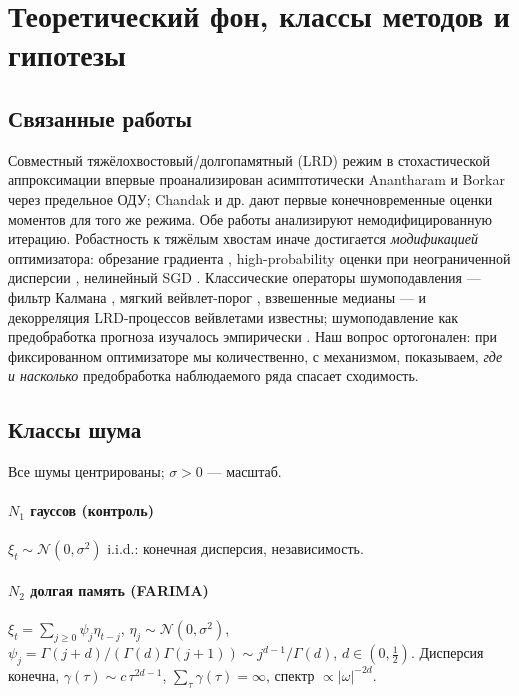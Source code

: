 \documentclass[conference]{IEEEtran}
\theoremstyle{plain}
\theoremstyle{definition}
\begin{document}
\section{Теоретический фон, классы методов и гипотезы}

\subsection{Связанные работы}
Совместный тяжёлохвостовый/долгопамятный (LRD) режим в стохастической
аппроксимации впервые проанализирован асимптотически Anantharam и
Borkar \cite{anantharam2012sa} через предельное ОДУ; Chandak и др.
\cite{chandak2026hl} дают первые конечновременные оценки моментов для
того же режима. Обе работы анализируют немодифицированную итерацию.
Робастность к тяжёлым хвостам иначе достигается \emph{модификацией}
оптимизатора: обрезание градиента \cite{gorbunov2020clipping},
high-probability оценки при неограниченной дисперсии
\cite{cutkosky2021high,sadiev2023highprob}, нелинейный SGD
\cite{armacki2024nonlinear}. Классические операторы шумоподавления ---
фильтр Калмана \cite{kalman1960}, мягкий вейвлет-порог
\cite{donoho1994wavelets,donoho1995noising,mallat1999wavelet},
взвешенные медианы \cite{yin1996median} --- и декорреляция LRD-процессов
вейвлетами \cite{percival2000wavelet} известны; шумоподавление как
предобработка прогноза изучалось эмпирически \cite{tang2021denoising}.
Наш вопрос ортогонален: при фиксированном оптимизаторе мы
количественно, с механизмом, показываем, \emph{где и насколько}
предобработка наблюдаемого ряда спасает сходимость.

\subsection{Классы шума}
Все шумы центрированы; $\sigma>0$ --- масштаб.

\paragraph*{$N_1$ гауссов (контроль)}
$\xi_t\sim\mathcal N(0,\sigma^2)$ i.i.d.: конечная дисперсия,
независимость.

\paragraph*{$N_2$ долгая память (FARIMA)}
$\xi_t=\sum_{j\ge0}\psi_j\eta_{t-j}$, $\eta_j\sim\mathcal N(0,\sigma^2)$,
$\psi_j=\Gamma(j+d)/(\Gamma(d)\Gamma(j+1))\sim j^{d-1}/\Gamma(d)$,
$d\in(0,\tfrac12)$. Дисперсия конечна, $\gamma(\tau)\sim c\,\tau^{2d-1}$,
$\sum_\tau\gamma(\tau)=\infty$, спектр $\propto|\omega|^{-2d}$.
\end{document}
